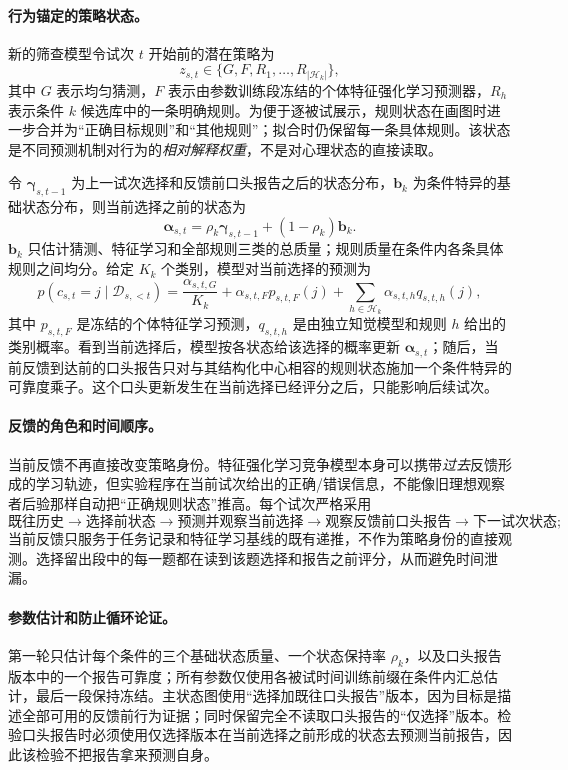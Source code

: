 \paragraph{行为锚定的策略状态。}
新的筛查模型令试次 $t$ 开始前的潜在策略为
\begin{equation}
z_{s,t}\in\{G,F,R_1,\ldots,R_{|\mathcal H_k|}\},
\end{equation}
其中 $G$ 表示均匀猜测，$F$ 表示由参数训练段冻结的个体特征强化学习预测器，$R_h$ 表示条件 $k$ 候选库中的一条明确规则。为便于逐被试展示，规则状态在画图时进一步合并为“正确目标规则”和“其他规则”；拟合时仍保留每一条具体规则。该状态是不同预测机制对行为的\emph{相对解释权重}，不是对心理状态的直接读取。

令 $\boldsymbol\gamma_{s,t-1}$ 为上一试次选择和反馈前口头报告之后的状态分布，$\mathbf b_k$ 为条件特异的基础状态分布，则当前选择之前的状态为
\begin{equation}
\boldsymbol\alpha_{s,t}
=
\rho_k\boldsymbol\gamma_{s,t-1}
+(1-\rho_k)\mathbf b_k.
\end{equation}
$\mathbf b_k$ 只估计猜测、特征学习和全部规则三类的总质量；规则质量在条件内各条具体规则之间均分。给定 $K_k$ 个类别，模型对当前选择的预测为
\begin{equation}
p(c_{s,t}=j\mid\mathcal D_{s,<t})
=
\frac{\alpha_{s,t,G}}{K_k}
+\alpha_{s,t,F}p_{s,t,F}(j)
+\sum_{h\in\mathcal H_k}\alpha_{s,t,h}q_{s,t,h}(j),
\end{equation}
其中 $p_{s,t,F}$ 是冻结的个体特征学习预测，$q_{s,t,h}$ 是由独立知觉模型和规则 $h$ 给出的类别概率。看到当前选择后，模型按各状态给该选择的概率更新 $\boldsymbol\alpha_{s,t}$；随后，当前反馈到达前的口头报告只对与其结构化中心相容的规则状态施加一个条件特异的可靠度乘子。这个口头更新发生在当前选择已经评分之后，只能影响后续试次。

\paragraph{反馈的角色和时间顺序。}
当前反馈不再直接改变策略身份。特征强化学习竞争模型本身可以携带\emph{过去}反馈形成的学习轨迹，但实验程序在当前试次给出的正确/错误信息，不能像旧理想观察者后验那样自动把“正确规则状态”推高。每个试次严格采用
\[
\text{既往历史}\rightarrow
\text{选择前状态}\rightarrow
\text{预测并观察当前选择}\rightarrow
\text{观察反馈前口头报告}\rightarrow
\text{下一试次状态};
\]
当前反馈只服务于任务记录和特征学习基线的既有递推，不作为策略身份的直接观测。选择留出段中的每一题都在读到该题选择和报告之前评分，从而避免时间泄漏。

\paragraph{参数估计和防止循环论证。}
第一轮只估计每个条件的三个基础状态质量、一个状态保持率 $\rho_k$，以及口头报告版本中的一个报告可靠度；所有参数仅使用各被试时间训练前缀在条件内汇总估计，最后一段保持冻结。主状态图使用“选择加既往口头报告”版本，因为目标是描述全部可用的反馈前行为证据；同时保留完全不读取口头报告的“仅选择”版本。检验口头报告时必须使用仅选择版本在当前选择之前形成的状态去预测当前报告，因此该检验不把报告拿来预测自身。


